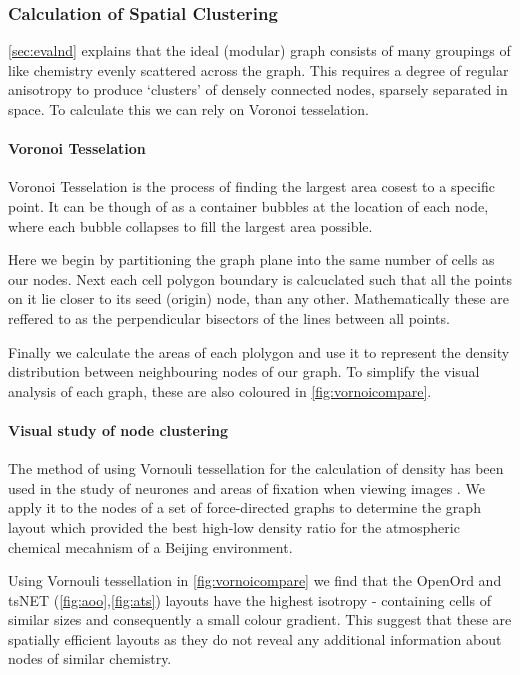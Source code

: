 \subsubsection{Calculation of Spatial Clustering}\label{sec:nodedensitya}
\autoref{sec:evalnd} explains that the ideal (modular) graph consists of many groupings of like chemistry evenly scattered across the graph.  This requires a degree of regular anisotropy to produce `clusters' of densely connected nodes, sparsely separated in space. To calculate this we can rely on Voronoi tesselation. 



\paragraph*{Voronoi Tesselation}
Voronoi Tesselation is the process of finding the largest area cosest to a specific point. It can be though of as a container bubbles at the location of each node, where each bubble collapses to fill the largest area possible.

Here we begin by partitioning the graph plane into the same number of cells as our nodes. Next each cell polygon boundary is calcuclated such that all the points on it lie closer to its seed (origin) node, than any other. Mathematically these are reffered to as the perpendicular bisectors of the lines between all points. 

Finally we calculate the areas of each plolygon and use it to represent the density distribution between neighbouring nodes of our graph. To simplify the visual analysis of each graph, these are also coloured in \autoref{fig:vornoicompare}. 


\paragraph*{Visual study of node clustering}

The method of using Vornouli tessellation for the calculation of density has been used in the study of neurones \citep{neurone} and areas of fixation when viewing images \citep{fixation}. We apply it to the nodes of a set of force-directed graphs to determine the graph layout which provided the best high-low density ratio for the atmospheric chemical mecahnism of a Beijing environment.
 
Using Vornouli tessellation in \autoref{fig:vornoicompare} we find that 
the OpenOrd and tsNET (\autoref{fig:aoo},\autoref{fig:ats}) layouts have the highest isotropy - containing cells of similar sizes and consequently a small colour gradient. This suggest that these are spatially efficient layouts as they do not reveal any additional information about nodes of similar chemistry. 

